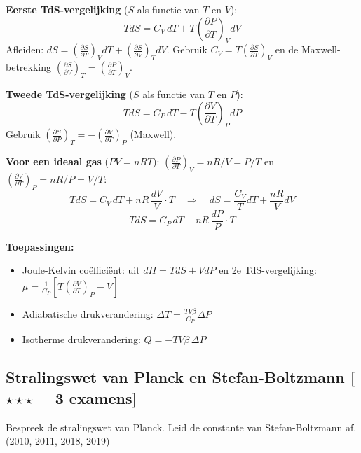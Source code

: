 \documentclass[10pt,a4paper]{article}
\newcommand{\pder}[2]{\left(\frac{\partial #1}{\partial #2}\right)}
\begin{document}
\begin{oplossing}
\textbf{Eerste TdS-vergelijking} ($S$ als functie van $T$ en $V$):
$$\boxed{TdS = C_V\,dT + T\pder{P}{T}_V dV}$$
Afleiden: $dS = \pder{S}{T}_V dT + \pder{S}{V}_T dV$. Gebruik $C_V = T\pder{S}{T}_V$ en de Maxwell-betrekking $\pder{S}{V}_T = \pder{P}{T}_V$.

\textbf{Tweede TdS-vergelijking} ($S$ als functie van $T$ en $P$):
$$\boxed{TdS = C_P\,dT - T\pder{V}{T}_P dP}$$
Gebruik $\pder{S}{P}_T = -\pder{V}{T}_P$ (Maxwell).

\textbf{Voor een ideaal gas} ($PV = nRT$): $\pder{P}{T}_V = nR/V = P/T$ en $\pder{V}{T}_P = nR/P = V/T$:
$$TdS = C_V\,dT + nR\,\frac{dV}{V} \cdot T \quad \Rightarrow \quad dS = \frac{C_V}{T}dT + \frac{nR}{V}dV$$
$$TdS = C_P\,dT - nR\,\frac{dP}{P} \cdot T$$

\textbf{Toepassingen:}
\begin{itemize}
  \item Joule-Kelvin coëfficiënt: uit $dH = TdS + VdP$ en 2e TdS-vergelijking: $\mu = \frac{1}{C_P}\left[T\pder{V}{T}_P - V\right]$
  \item Adiabatische drukverandering: $\Delta T = \frac{TV\beta}{C_P}\Delta P$
  \item Isotherme drukverandering: $Q = -TV\beta\,\Delta P$
\end{itemize}
\end{oplossing}

\subsection{Stralingswet van Planck en Stefan-Boltzmann \textnormal{\color{warningred}[$\star\star\star$\ -- 3 examens]}}

\begin{theorievraag}{Bespreek de stralingswet van Planck. Leid de constante van Stefan-Boltzmann af. \textnormal{(2010, 2011, 2018, 2019)}}
\end{theorievraag}
\end{document}
